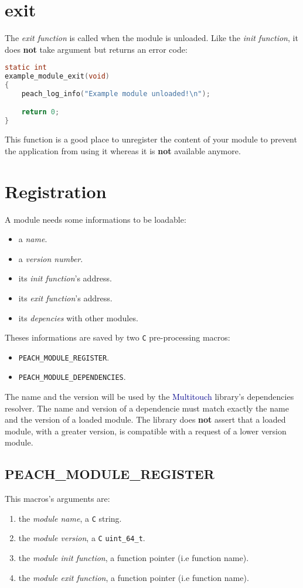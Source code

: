 %
%
\section{exit}
\label{sect:module_exit}
The \textit{exit function} is called when the module is unloaded. Like the 
\textit{init function}, it does \textbf{not} take argument but returns an 
error code:
\begin{lstlisting}[language=C, caption=Module's exit function example]
static int
example_module_exit(void)
{
    peach_log_info("Example module unloaded!\n");

    return 0; 
}
\end{lstlisting}

This function is a good place to unregister the content of your module to
prevent the application from using it whereas it is \textbf{not} available 
anymore.

%
%
\section{Registration}
\label{sect:module_registration}
A module needs some informations to be loadable:
\begin{itemize}
\item a \textit{name}.
\item a \textit{version number}.
\item its \textit{init function}'s address.
\item its \textit{exit function}'s address.
\item its \textit{depencies} with other modules.
\end{itemize}
Theses informations are saved by two \texttt{C} pre-processing macros:
\begin{itemize}
\item \texttt{PEACH\_MODULE\_REGISTER}.
\item \texttt{PEACH\_MODULE\_DEPENDENCIES}.
\end{itemize}
The name and the version will be used by the \textcolor{darkblue}{Multitouch}
library's dependencies resolver. The name and version of a dependencie must
match exactly the name and the version of a loaded module. The library does 
\textbf{not} assert that a loaded module, with a greater version, is compatible
with a request of a lower version module.

%
%
\subsection{PEACH\_MODULE\_REGISTER}
This macros's arguments are:
\begin{enumerate}
\item the \textit{module name}, a \texttt{C} string.
\item the \textit{module version}, a \texttt{C} \texttt{uint\_64\_t}.
\item the \textit{module init function}, a function pointer (i.e function name).
\item the \textit{module exit function}, a function pointer (i.e function name).
\end{enumerate}


